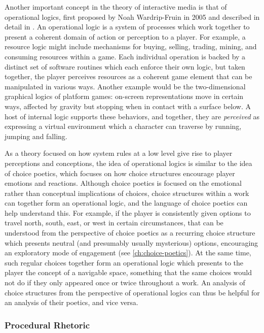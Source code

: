 Another important concept in the theory of interactive media is that of operational logics, first proposed by Noah Wardrip-Fruin in 2005 \citep{WardripFruin2005} and described in detail in \citep{Mateas2009}.
%
An operational logic is a system of processes which work together to present a coherent domain of action or perception to a player.
%
For example, a resource logic might include mechanisms for buying, selling, trading, mining, and consuming resources within a game.
%
Each individual operation is backed by a distinct set of software routines which each enforce their own logic, but taken together, the player perceives resources as a coherent game element that can be manipulated in various ways.
%
Another example would be the two-dimensional graphical logics of platform games: on-screen representations move in certain ways, affected by gravity but stopping when in contact with a surface below.
%
A host of internal logic supports these behaviors, and together, they are \emph{perceived} as expressing a virtual environment which a character can traverse by running, jumping and falling.


As a theory focused on how system rules at a low level give rise to player perceptions and conceptions, the idea of operational logics is similar to the idea of choice poetics, which focuses on how choice structures encourage player emotions and reactions.
%
Although choice poetics is focused on the emotional rather than conceptual implications of choices, choice structures within a work can together form an operational logic, and the language of choice poetics can help understand this.
%
For example, if the player is consistently given options to travel north, south, east, or west in certain circumstances, that can be understood from the perspective of choice poetics as a recurring choice structure which presents neutral (and presumably usually mysterious) options, encouraging an exploratory mode of engagement (see \cref{ch:choice-poetics}).
%
At the same time, such regular choices together form an operational logic which presents to the player the concept of a navigable space, something that the same choices would not do if they only appeared once or twice throughout a work.
%
An analysis of choice structures from the perspective of operational logics can thus be helpful for an analysis of their poetics, and vice versa.


\subsubsection{Procedural Rhetoric}

